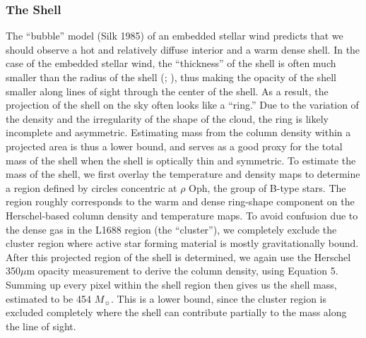 \documentclass[11pt,a4paper]{emulateapj}
\begin{document}
\subsubsection{The Shell}
The ``bubble'' model (Silk 1985) of an embedded stellar wind predicts that we should observe a hot and relatively diffuse interior and a warm dense shell. In the case of the embedded stellar wind, the ``thickness'' of the shell is often much smaller than the radius of the shell (\citet{Churchwell_2007}; \citet{Arce_2011}), thus making the opacity of the shell smaller along lines of sight through the center of the shell. As a result, the projection of the shell on the sky often looks like a ``ring.'' Due to the variation of the density and the irregularity of the shape of the cloud, the ring is likely incomplete and asymmetric. Estimating mass from the column density within a projected area is thus a lower bound, and serves as a good proxy for the total mass of the shell when the shell is optically thin and symmetric. To estimate the mass of the shell, we first overlay the temperature and density maps to determine a region defined by circles concentric at $\rho$ Oph, the group of B-type stars. The region roughly corresponds to the warm and dense ring-shape component on the Herschel-based column density and temperature maps. To avoid confusion due to the dense gas in the L1688 region (the ``cluster''), we completely exclude the cluster region where active star forming material is mostly gravitationally bound. After this projected region of the shell is determined, we again use the Herschel 350$\mu$m opacity measurement to derive the column density, using Equation 5. Summing up every pixel within the shell region then gives us the shell mass, estimated to be 454 $M_{\sun}$. This is a lower bound, since the cluster region is excluded completely where the shell can contribute partially to the mass along the line of sight.
\end{document}
